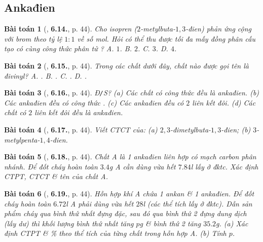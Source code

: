 \documentclass{article}
\numberwithin{equation}{section}
\newtheorem{baitoan}{Bài toán}[section]
\begin{document}

\subsection{Ankađien}

\begin{baitoan}[\cite{SBT_Hoa_Hoc_11_co_ban}, \textbf{6.14.}, p. 44]
	Cho isopren ($2$-metylbuta-$1,3$-đien) phản ứng cộng với brom theo tỷ lệ $1:1$ về số mol. Hỏi có thể thu được tối đa mấy đồng phân cấu tạo có cùng công thức phân tử \emph{}? {\sf A.} $1$. {\sf B.} $2$. {\sf C.} $3$. {\sf D.} $4$.
\end{baitoan}

\begin{baitoan}[\cite{SBT_Hoa_Hoc_11_co_ban}, \textbf{6.15.}, p. 44]
	Trong các chất dưới đây, chất nào được gọi tên là \emph{đivinyl}? {\sf A.} \emph{}. {\sf B.} \emph{}. {\sf C.} \emph{}. {\sf D.} \emph{}.
\end{baitoan}

\begin{baitoan}[\cite{SBT_Hoa_Hoc_11_co_ban}, \textbf{6.16.}, p. 44]
	\emph{Đ\texttt{/}S?} (a) Các chất có công thức \emph{} đều là ankađien. (b) Các ankađien đều có công thức \emph{}. (c) Các ankađien đều có $2$ liên kết đôi. (d) Các chất có $2$ liên kết đôi đều là ankađien.
\end{baitoan}

\begin{baitoan}[\cite{SBT_Hoa_Hoc_11_co_ban}, \textbf{6.17.}, p. 44]
	Viết CTCT của: (a) $2,3$-đimetylbuta-$1,3$-đien; (b) $3$-metylpenta-$1,4$-đien.
\end{baitoan}

\begin{baitoan}[\cite{SBT_Hoa_Hoc_11_co_ban}, \textbf{6.18.}, p. 44]
	Chất A là 1 ankađien liên hợp có mạch carbon phân nhánh. Để đốt cháy hoàn toàn $3.4$\emph{g} A cần dùng vừa hết $7.84$\emph{l} \emph{} lấy ở đktc. Xác định CTPT, CTCT \& tên của chất A.
\end{baitoan}

\begin{baitoan}[\cite{SBT_Hoa_Hoc_11_co_ban}, \textbf{6.19.}, p. 44]
	Hỗn hợp khí A chứa 1 ankan \& 1 ankađien. Để đốt cháy hoàn toàn $6.72$\emph{l} A phải dùng vừa hết $28$\emph{l} \emph{} (các thể tích lấy ở đktc). Dẫn sản phẩm cháy qua bình thứ nhất đựng \emph{} đặc, sau đó qua bình thứ 2 đựng dung dịch \emph{} (lấy dư) thì khối lượng bình thứ nhất tăng $p$\emph{g} \& bình thứ 2 tăng $35.2$\emph{g}. (a) Xác định CTPT \& \% theo thể tích của từng chất trong hỗn hợp A. (b) Tính $p$.
\end{baitoan}
\end{document}
